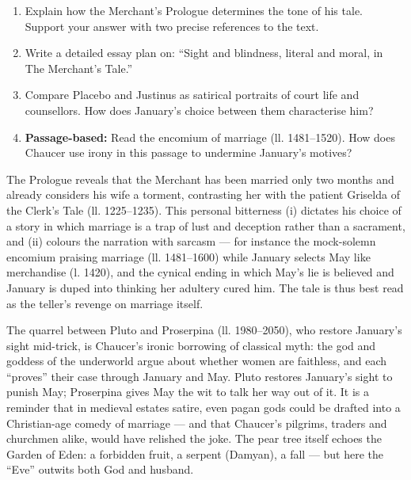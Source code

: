 \documentclass[11pt]{article}
\begin{document}
\begin{exercice}
\begin{enumerate}
\item Explain how the Merchant's Prologue determines the tone of his tale. Support your answer with two precise references to the text.
\item Write a detailed essay plan on: ``Sight and blindness, literal and moral, in The Merchant's Tale.''
\item Compare Placebo and Justinus as satirical portraits of court life and counsellors. How does January's choice between them characterise him?
\item \textbf{Passage-based:} Read the encomium of marriage (ll. 1481--1520). How does Chaucer use irony in this passage to undermine January's motives?
\end{enumerate}
\end{exercice}

\begin{corrige}[Exercise 1]
The Prologue reveals that the Merchant has been married only two months and already considers his wife a torment, contrasting her with the patient Griselda of the Clerk's Tale (ll. 1225--1235). This personal bitterness (i) dictates his choice of a story in which marriage is a trap of lust and deception rather than a sacrament, and (ii) colours the narration with sarcasm --- for instance the mock-solemn encomium praising marriage (ll. 1481--1600) while January selects May like merchandise (l. 1420), and the cynical ending in which May's lie is believed and January is duped into thinking her adultery cured him. The tale is thus best read as the teller's revenge on marriage itself.
\end{corrige}

\begin{savaistu}
The quarrel between Pluto and Proserpina (ll. 1980--2050), who restore January's sight mid-trick, is Chaucer's ironic borrowing of classical myth: the god and goddess of the underworld argue about whether women are faithless, and each ``proves'' their case through January and May. Pluto restores January's sight to punish May; Proserpina gives May the wit to talk her way out of it. It is a reminder that in medieval estates satire, even pagan gods could be drafted into a Christian-age comedy of marriage --- and that Chaucer's pilgrims, traders and churchmen alike, would have relished the joke. The pear tree itself echoes the Garden of Eden: a forbidden fruit, a serpent (Damyan), a fall --- but here the ``Eve'' outwits both God and husband.
\end{savaistu}
\end{document}
